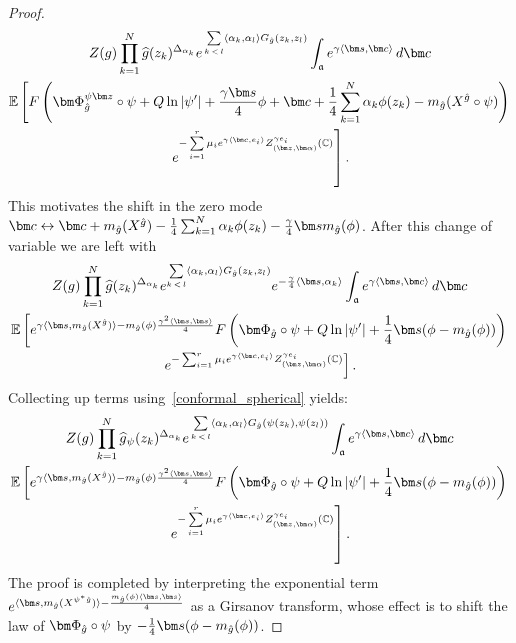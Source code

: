 \documentclass[10pt]{amsart}
\theoremstyle{definition}\newtheorem{defi}[theo]{Definition}\newtheorem{rema}[theo]{Remark}\newtheorem{exam}[theo]{Example}\newtheorem{exem}[theo]{Example}\newtheorem{nota}[theo]{Notation}
\newcommand{\frka}{\mathfrak{a}}
\newcommand{\C}{\mathbb{C}}
\newcommand{\E}{\mathbb{E}}
\newcommand{\ps}[1]{\langle #1 \rangle}
\newcommand*\green[1]{#1}
\newcommand{\norm}[1]{\left\lvert#1\right\rvert}
\let\oldhat\hat
\renewcommand*{\hat}[1]{\mathchoice{\widehat{#1}}{\widehat{#1}}{\oldhat{#1}}{\oldhat{#1}}}
\begin{document}
\begin{proof}
\begin{multline*}
Z(g)\prod_{k=1}^N \hat g (z_k)^{\Delta_{\alpha_k}}e^{\,\sum\limits_{ k\,<\,l} \langle\alpha_k,\alpha_l \rangle G_{\hat g}(z_k,z_l) }\int_{ \frka} e^{\gamma \ps{\bm s,\bm c}}\,d\bm c\\
\E \left [F\left(\bm\Phi_{\hat g}^{\psi\bm z}\circ\psi+ Q\ln\norm{\psi'}+\frac{\gamma \bm s}{4}\phi+\bm c+\frac14\sum_{k=1}^N\alpha_k\phi(z_k)-m_{\hat g}(X^{\hat g}\circ\psi)\right)\right.\\
\left. e^{- \sum\limits_{i=1}^{r} \mu_i e^{\gamma \langle \bm c,e_i\rangle }Z_{(\bm z,\bm \alpha)}^{\gamma e_i} (\C)} \right].
\end{multline*}
This motivates the shift in the zero mode $\bm c\leftrightarrow\bm c+ m_{\hat g}(X^{\hat g})-\frac14\sum_{k=1}^N\alpha_k\phi(z_k)-\frac\gamma4\bm sm_{\hat g}(\phi)$. After this change of variable we are left with
\begin{multline*}
Z(g)\prod_{k=1}^N \hat g (z_k)^{\Delta_{\alpha_k}}e^{ \sum\limits_{ k\,<\,l} \langle\alpha_k,\alpha_l \rangle G_{\hat g}(z_k,z_l) }e^{-\frac{\gamma}{4}\ps{\bm s,\alpha_k}}\int_{ \frka} e^{\gamma \ps{\bm s,\bm c}}\,d\bm c \\
\E \left [e^{\gamma\ps{\bm s,m_{\hat g}(X^{\hat g})}-m_{\hat g}(\phi)\frac{\gamma^2\ps{\bm s,\bm s}}4}F\left(\bm\Phi_{\hat g}\circ\psi+ Q\ln\norm{\psi'}+\frac14\bm s(\phi-m_{\hat g}(\phi))\right)\right.\\
\left. e^{- \sum_{i=1}^{r} \mu_i e^{\gamma \langle \bm c,e_i\rangle }Z_{(\bm z,\bm \alpha)}^{\gamma e_i} (\C)} \right].
\end{multline*}
Collecting up terms using~\eqref{conformal_spherical} yields:
\begin{multline*}
Z(g)\prod_{k=1}^N \hat g_\psi (z_k)^{\Delta_{\alpha_k}}e^{\,\sum\limits_{ k\,<\,l} \langle\alpha_k,\alpha_l \rangle G_{\hat g}(\psi(z_k),\psi(z_l)) }\int_{ \frka} e^{\green\gamma\ps{\bm s,\bm c}}\,d\bm c\\
\E \left [e^{\green\gamma\ps{\bm s,m_{\hat g}(X^{\hat g})}-m_{\hat g}(\phi)\frac{\gamma^2\ps{\bm s,\bm s}}4} F\left(\bm\Phi_{\hat g}\circ\psi+ Q\ln\norm{\psi'}+\frac14\bm s(\phi-m_{\hat g}(\phi))\right)\right.\\
\left. e^{- \sum\limits_{i=1}^{r} \mu_i e^{\gamma \langle \bm c,e_i\rangle }Z_{(\bm z,\bm \alpha)}^{\gamma e_i} (\C)} \right].
\end{multline*}
The proof is completed by interpreting the exponential term $e^{\ps{\bm s,m_{\hat g}(X^{\psi^*\hat g})}-\frac{m_{\hat g}(\phi)\ps{\bm s,\bm s}}4}$ as a Girsanov transform, whose effect is to shift the law of $\bm\Phi_{\hat g}\circ\psi$ by $-\frac14\bm s(\phi-m_{\hat g}(\phi))$.
\end{proof}
\end{document}
